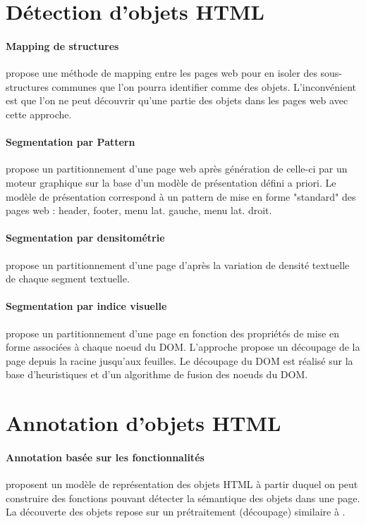 \documentclass[10pt,a4paper]{article}
\author{Franck Petitdemange}
\begin{document}
\section{Détection d'objets HTML}
\paragraph*{Mapping de structures} \cite{vieira2006fast} propose une méthode de mapping entre les pages web pour en isoler des sous-structures communes que l'on pourra identifier comme des objets. L'inconvénient est que l'on ne peut découvrir qu'une partie des objets dans les pages web avec cette approche. 

\paragraph*{Segmentation par Pattern} \cite{kovacevic2002recognition} propose un partitionnement d'une page web après génération de celle-ci par un moteur graphique sur la base d'un modèle de présentation défini a priori. Le modèle de présentation correspond à un pattern de mise en forme "standard" des pages web : header, footer, menu lat. gauche, menu lat. droit. 

\paragraph*{Segmentation par densitométrie} \cite{kohlschutter2008densitometric} propose un partitionnement d'une page d'après la variation de densité textuelle de chaque segment textuelle.

\paragraph*{Segmentation par indice visuelle} \cite{cai2003extracting} propose un partitionnement d'une page en fonction des propriétés de mise en forme associées à chaque noeud du DOM. L'approche propose un découpage de la page depuis la racine jusqu'aux feuilles. Le découpage du DOM est réalisé sur la base d'heuristiques et d'un algorithme de fusion des noeuds du DOM.

\section{Annotation d'objets HTML} 

\paragraph*{Annotation basée sur les fonctionnalités} \cite{chen2001function} proposent un modèle de représentation des objets HTML à partir duquel on peut construire des fonctions pouvant détecter la sémantique des objets dans une page. La découverte des objets repose sur un prétraitement (découpage) similaire à \cite{cai2003extracting}.
\end{document}
